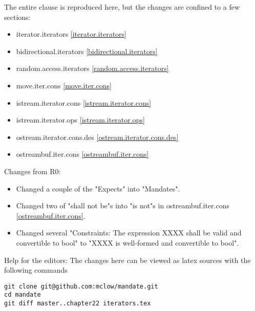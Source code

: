 The entire clause is reproduced here, but the changes are confined to a few sections:

\begin{itemize}
\item{iterator.iterators        \ref{iterator.iterators}}
\item{bidirectional.iterators   \ref{bidirectional.iterators}}
\item{random.access.iterators   \ref{random.access.iterators}}
\item{move.iter.cons            \ref{move.iter.cons}}
\item{istream.iterator.cons     \ref{istream.iterator.cons}}
\item{istream.iterator.ops      \ref{istream.iterator.ops}}
\item{ostream.iterator.cons.des \ref{ostream.iterator.cons.des}}
\item{ostreambuf.iter.cons      \ref{ostreambuf.iter.cons}}
\end{itemize}

Changes from R0:
\begin{itemize}
\item{Changed a couple of the "Expects" into "Mandates".}
\item{Changed two of "shall not be"s into "is not"s in ostreambuf.iter.cons \ref{ostreambuf.iter.cons}.}
\item{Changed several "Constraints: The expression XXXX shall be valid and convertible to bool" to "XXXX is well-formed and convertible to bool".}
\end{itemize}

\vfill
Help for the editors: The changes here can be viewed as latex sources with the following commands
\begin{verbatim}
git clone git@github.com:mclow/mandate.git
cd mandate
git diff master..chapter22 iterators.tex
\end{verbatim}
\newpage
